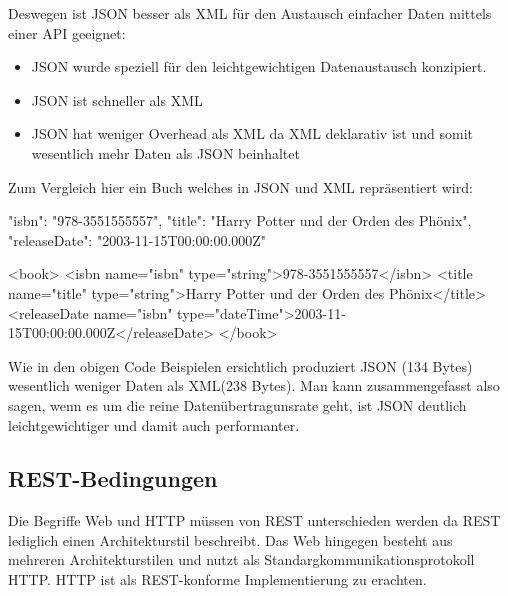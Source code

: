 \documentclass[bachelor, german ]{hgbthesis}
\begin{document}
Deswegen ist JSON besser als XML für den Austausch einfacher Daten mittels einer API geeignet:
\begin{itemize}
    \item JSON wurde speziell für den leichtgewichtigen Datenaustausch konzipiert.
    \item JSON ist schneller als XML
    \item JSON hat weniger Overhead als XML da XML deklarativ ist und somit wesentlich mehr Daten als JSON beinhaltet
\end{itemize}

Zum Vergleich hier ein Buch welches in JSON und XML repräsentiert wird:
\begin{JsCode}
{
    "isbn": "978-3551555557",
    "title": "Harry Potter und der Orden des Phönix",
    "releaseDate": "2003-11-15T00:00:00.000Z"
}
\end{JsCode}

\begin{XmlCode}
<book>
    <isbn name="isbn" type="string">978-3551555557</isbn>
    <title name="title" type="string">Harry Potter und der Orden des Phönix</title>
    <releaseDate name="isbn" type="dateTime">2003-11-15T00:00:00.000Z</releaseDate>
</book>
\end{XmlCode}

Wie in den obigen Code Beispielen ersichtlich produziert JSON (134 Bytes) wesentlich weniger Daten als XML(238 Bytes).
Man kann zusammengefasst also sagen, wenn es um die reine Datenübertragunsrate geht, ist JSON deutlich leichtgewichtiger und damit auch performanter.

\subsection{REST-Bedingungen}
Die Begriffe Web und HTTP müssen von REST unterschieden werden da REST lediglich einen Architekturstil beschreibt. Das Web hingegen besteht aus mehreren Architekturstilen und nutzt als Standargkommunikationsprotokoll HTTP. HTTP ist als
REST-konforme Implementierung zu erachten.
\end{document}
